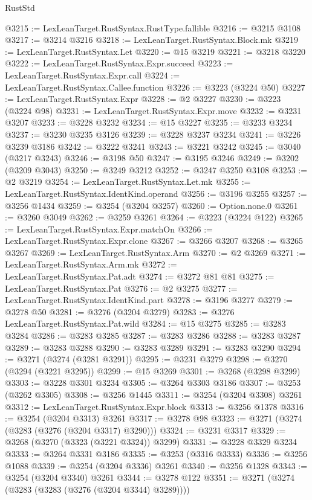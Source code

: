 \begin{lexlean}{RustStd}
\begin{coremodule}
@3215 := LexLeanTarget.RustSyntax.RustType.fallible
@3216 := @3215 @3108
@3217 := @3214 @3216
@3218 := LexLeanTarget.RustSyntax.Block.mk
@3219 := LexLeanTarget.RustSyntax.Let
@3220 := @15 @3219
@3221 := @3218 @3220
@3222 := LexLeanTarget.RustSyntax.Expr.succeed
@3223 := LexLeanTarget.RustSyntax.Expr.call
@3224 := LexLeanTarget.RustSyntax.Callee.function
@3226 := @3223 (@3224 @50)
@3227 := LexLeanTarget.RustSyntax.Expr
@3228 := @2 @3227
@3230 := @3223 (@3224 @98)
@3231 := LexLeanTarget.RustSyntax.Expr.move
@3232 := @3231 @3207
@3233 := @3228 @3232
@3234 := @15 @3227
@3235 := @3233 @3234
@3237 := @3230 @3235 @3126
@3239 := @3228 @3237 @3234
@3241 := @3226 @3239 @3186
@3242 := @3222 @3241
@3243 := @3221 @3242
@3245 := @3040 (@3217 @3243)
@3246 := @3198 @50
@3247 := @3195 @3246
@3249 := @3202 (@3209 @3043)
@3250 := @3249 @3212
@3252 := @3247 @3250 @3108
@3253 := @2 @3219
@3254 := LexLeanTarget.RustSyntax.Let.mk
@3255 := LexLeanTarget.RustSyntax.IdentKind.operand
@3256 := @3196 @3255
@3257 := @3256 @1434
@3259 := @3254 (@3204 @3257)
@3260 := Option.none.{0}
@3261 := @3260 @3049
@3262 := @3259 @3261
@3264 := @3223 (@3224 @122)
@3265 := LexLeanTarget.RustSyntax.Expr.matchOn
@3266 := LexLeanTarget.RustSyntax.Expr.clone
@3267 := @3266 @3207
@3268 := @3265 @3267
@3269 := LexLeanTarget.RustSyntax.Arm
@3270 := @2 @3269
@3271 := LexLeanTarget.RustSyntax.Arm.mk
@3272 := LexLeanTarget.RustSyntax.Pat.adt
@3274 := @3272 @81 @81
@3275 := LexLeanTarget.RustSyntax.Pat
@3276 := @2 @3275
@3277 := LexLeanTarget.RustSyntax.IdentKind.part
@3278 := @3196 @3277
@3279 := @3278 @50
@3281 := @3276 (@3204 @3279)
@3283 := @3276 LexLeanTarget.RustSyntax.Pat.wild
@3284 := @15 @3275
@3285 := @3283 @3284
@3286 := @3283 @3285
@3287 := @3283 @3286
@3288 := @3283 @3287
@3289 := @3283 @3288
@3290 := @3283 @3289
@3291 := @3283 @3290
@3294 := @3271 (@3274 (@3281 @3291))
@3295 := @3231 @3279
@3298 := @3270 (@3294 (@3221 @3295))
@3299 := @15 @3269
@3301 := @3268 (@3298 @3299)
@3303 := @3228 @3301 @3234
@3305 := @3264 @3303 @3186
@3307 := @3253 (@3262 @3305)
@3308 := @3256 @1445
@3311 := @3254 (@3204 @3308) @3261
@3312 := LexLeanTarget.RustSyntax.Expr.block
@3313 := @3256 @1378
@3316 := @3254 (@3204 @3313) @3261
@3317 := @3278 @98
@3323 := @3271 (@3274 (@3283 (@3276 (@3204 @3317) @3290)))
@3324 := @3231 @3317
@3329 := @3268 (@3270 (@3323 (@3221 @3324)) @3299)
@3331 := @3228 @3329 @3234
@3333 := @3264 @3331 @3186
@3335 := @3253 (@3316 @3333)
@3336 := @3256 @1088
@3339 := @3254 (@3204 @3336) @3261
@3340 := @3256 @1328
@3343 := @3254 (@3204 @3340) @3261
@3344 := @3278 @122
@3351 := @3271 (@3274 (@3283 (@3283 (@3276 (@3204 @3344) @3289))))

\end{coremodule}
\end{lexlean}
